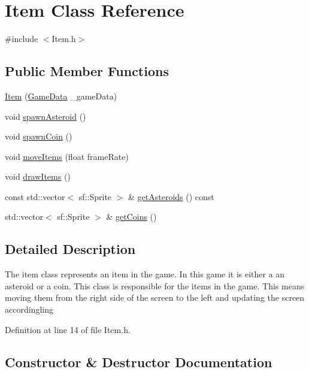\hypertarget{class_item}{}\section{Item Class Reference}
\label{class_item}


{\ttfamily \#include $<$Item.\+h$>$}

\subsection*{Public Member Functions}
\begin{DoxyCompactItemize}
\item 
\mbox{\hyperlink{class_item_aaded2a7e8d7d74ceb9838fc0d9da2ea3}{Item}} (\mbox{\hyperlink{_engine_8h_a5bbe002e9f7f45a67e8fda9dbe980a3f}{Game\+Data}} \+\_\+game\+Data)
\item 
void \mbox{\hyperlink{class_item_acbef638becdf16de85c9602a93d47518}{spawn\+Asteroid}} ()
\item 
void \mbox{\hyperlink{class_item_ad79f9b2e0ad9cb922cd7678fc8dc628e}{spawn\+Coin}} ()
\item 
void \mbox{\hyperlink{class_item_ac28d0cbacc49ab30bdd0c593600a75be}{move\+Items}} (float frame\+Rate)
\item 
void \mbox{\hyperlink{class_item_a468f79141232febc578c8cefe32b2791}{draw\+Items}} ()
\item 
const std\+::vector$<$ sf\+::\+Sprite $>$ \& \mbox{\hyperlink{class_item_a040b4ff526f1ab5340b3a7ea630037ba}{get\+Asteroids}} () const
\item 
std\+::vector$<$ sf\+::\+Sprite $>$ \& \mbox{\hyperlink{class_item_a272b51e3dad8000fe006b0aa5b4ec259}{get\+Coins}} ()
\end{DoxyCompactItemize}


\subsection{Detailed Description}
The item class represents an item in the game. In this game it is either a an asteroid or a coin. This class is responsible for the items in the game. This means moving them from the right side of the screen to the left and updating the screen accordingling 

Definition at line 14 of file Item.\+h.



\subsection{Constructor \& Destructor Documentation}
\mbox{\label{class_item_aaded2a7e8d7d74ceb9838fc0d9da2ea3}} 
